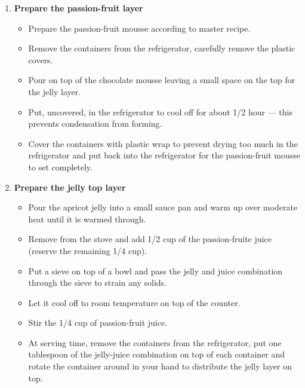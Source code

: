 \documentclass[11pt,letterpaper]{article}
\newcommand \fileName {ChocolatePassion}
\begin{document}
\begin{description}
\begin{enumerate}
	\item {\bf Prepare the passion-fruit layer}
		\begin{itemize}
		\item Prepare the passion-fruit mousse according to master recipe.
                \item Remove the containers from the refrigerator, carefully remove the plastic covers.
                \item Pour on top of the chocolate mousse leaving a small space on the top for the jelly layer.
		\item Put, uncovered, in the refrigerator to cool off for about 1/2 hour --- this prevents condensation from forming.
		\item Cover the containers with plastic wrap to prevent drying too much in the refrigerator and put back into the refrigerator for the passion-fruit mousse to set completely.
		\end{itemize}
	\item {\bf Prepare the jelly top layer}
		\begin{itemize}
		\item Pour the apricot jelly into a small sauce pan and warm up over moderate heat until it is warmed through.
		\item Remove from the stove and add 1/2 cup of the passion-fruite juice (reserve the remaining 1/4 cup).
                \item Put a sieve on top of a bowl and pass the jelly and juice combination through the sieve to strain any solids.
		\item Let it cool off to room temperature on top of the counter.
                \item Stir the 1/4 cup of passion-fruit juice.
                \item At serving time, remove the containers from the refrigerator, put one tablespoon of the jelly-juice combination on top of each container and rotate the container around in your hand to distribute the jelly layer on top. 
		\end{itemize}	
		\end{enumerate}
\end{description}

\end{document}
